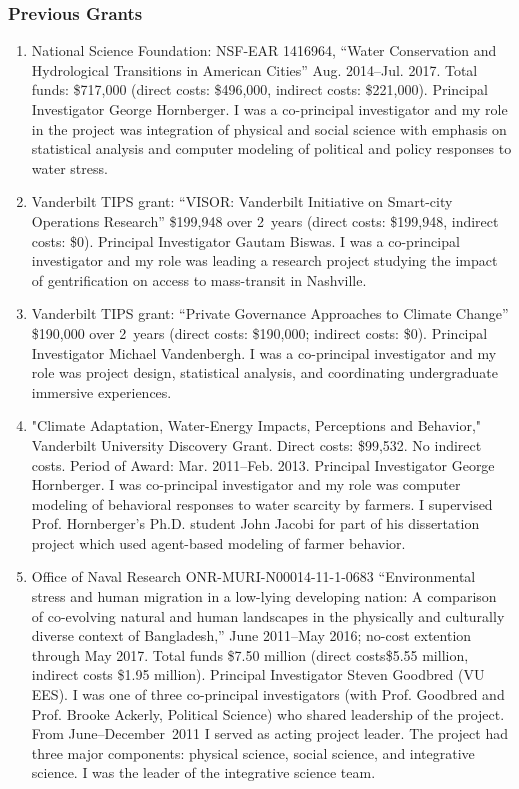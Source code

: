 \subsubsection{Previous Grants}
\begin{enumerate}
    \item National Science Foundation: NSF-EAR 1416964, ``Water Conservation and Hydrological Transitions in American Cities'' Aug. 2014--Jul. 2017. Total funds: \$717,000 (direct costs: \$496,000, indirect costs: \$221,000). Principal Investigator George Hornberger. I was a co-principal investigator and my role in the project was integration of physical and social science with emphasis on statistical analysis and computer modeling of political and policy responses to water stress.
    \item Vanderbilt TIPS grant: ``VISOR: Vanderbilt Initiative on Smart-city Operations Research'' \$199,948 over 2~years (direct costs: \$199,948, indirect costs: \$0). Principal Investigator Gautam Biswas. I was a co-principal investigator and my role was leading a research project studying the impact of gentrification on access to mass-transit in Nashville.
    \item Vanderbilt TIPS grant: ``Private Governance Approaches to Climate Change'' \$190,000 over 2~years (direct costs: \$190,000; indirect costs: \$0). Principal Investigator Michael Vandenbergh. I was a co-principal investigator and my role was project design, statistical analysis,
    and coordinating undergraduate immersive experiences.
    \item "Climate Adaptation, Water-Energy Impacts, Perceptions and Behavior," Vanderbilt University Discovery Grant. Direct costs: \$99,532. No indirect costs. Period of Award: Mar. 2011--Feb. 2013. Principal Investigator George Hornberger. I was co-principal investigator and my role was computer modeling of behavioral responses to water scarcity by farmers. I supervised Prof. Hornberger's Ph.D. student John Jacobi for part of his dissertation project which used agent-based modeling of farmer behavior.
    \item Office of Naval Research ONR-MURI-N00014-11-1-0683 ``Environmental stress and human migration in a low-lying developing nation: A comparison of co-evolving natural and human landscapes in the physically and culturally diverse context of Bangladesh,'' June 2011--May 2016; no-cost extention through May 2017. Total funds \$7.50 million (direct costs\$5.55 million, indirect costs \$1.95 million). Principal Investigator Steven Goodbred (VU EES). I was one of three co-principal investigators (with Prof. Goodbred and Prof. Brooke Ackerly, Political Science) who shared leadership of the project. From June--December~2011 I served as acting project leader. The project had three major components: physical science, social science, and integrative science. I was the leader of the integrative science team.

\end{enumerate}
